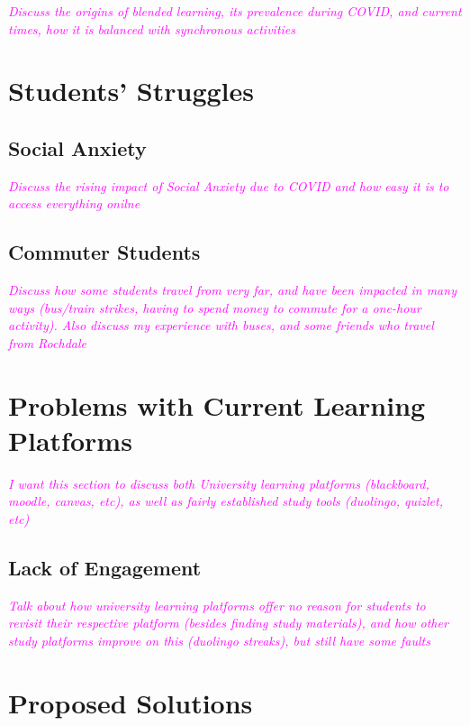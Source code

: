 \documentclass{report}
\begin{document}
\textcolor{magenta}{\textit{Discuss the origins of blended learning, its prevalence during COVID, and current times, how it is balanced with synchronous activities}}

\section{Students' Struggles}

\subsection{Social Anxiety}

\textcolor{magenta}{\textit{Discuss the rising impact of Social Anxiety due to COVID and how easy it is to access everything onilne}}

\subsection{Commuter Students}

\textcolor{magenta}{\textit{Discuss how some students travel from very far, and have been impacted in many ways (bus/train strikes, having to spend money to commute for a one-hour activity). Also discuss my experience with buses, and some friends who travel from Rochdale}}

\section{Problems with Current Learning Platforms}

\textcolor{magenta}{\textit{I want this section to discuss both University learning platforms (blackboard, moodle, canvas, etc), as well as fairly established study tools (duolingo, quizlet, etc)}}

\subsection{Lack of Engagement}

\textcolor{magenta}{\textit{Talk about how university learning platforms offer no reason for students to revisit their respective platform (besides finding study materials), and how other study platforms improve on this (duolingo streaks), but still have some faults}}

\section{Proposed Solutions}
\end{document}

